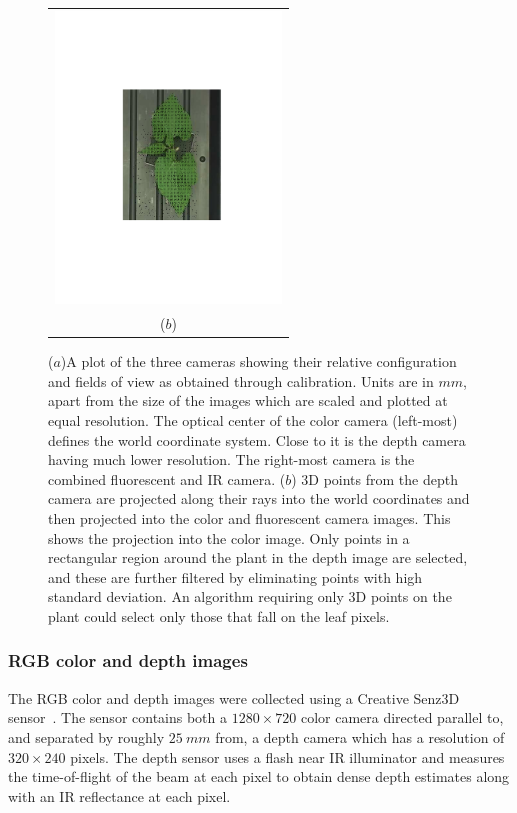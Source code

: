 \begin{figure}
\begin{tabular}{c}
  \includegraphics[width=6cm,trim=100 200 100 200,clip]{Figures/DepthOnBeanRGB} \\
  ($b$)\\
\end{tabular}
\caption{($a$)A plot of the three cameras showing their relative configuration and fields of view as obtained through calibration.  Units are in $mm$, apart from the size of the images which are scaled and plotted at equal resolution.  The optical center of the color camera (left-most) defines the world coordinate system.  Close to it is the depth camera having much lower resolution.  The right-most camera is the combined fluorescent and IR camera. ($b$) $3$D points from the depth camera are projected along their rays into the world coordinates and then projected into the color and fluorescent camera images.  This shows the projection into the color image.  Only points in a rectangular region around the plant in the depth image are selected, and these are further filtered by eliminating points with high standard deviation.  An algorithm requiring only $3$D points on the plant could select only those that fall on the leaf pixels.}
\label{fig:CameraConfiguration}
\end{figure}

\subsubsection{RGB color and depth images} %

The RGB color and depth images were collected using a Creative Senz3D sensor~\cite{nguyen2015vietnamese}. The sensor contains both a $1280 \times 720$ color camera directed parallel to, and separated by roughly $25~mm$ from, a depth camera which has a resolution of $320\times240$ pixels. 
The depth sensor uses a flash near IR illuminator and measures the time-of-flight of the beam at each pixel to obtain dense depth estimates along with an IR reflectance at each pixel.

